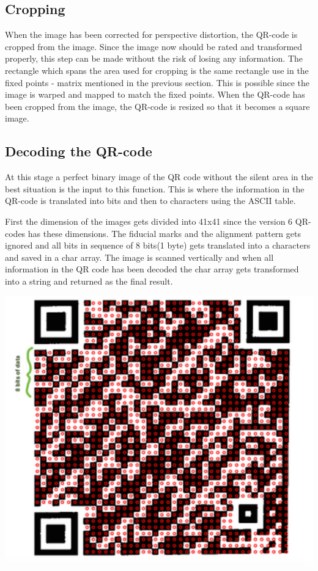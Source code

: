 \documentclass[12pt,a4paper]{article}
\newenvironment{Figure}
  {\par\medskip\noindent\minipage{\linewidth}}
  {\endminipage\par\medskip}
\begin{document}
\subsection{Cropping}
When the image has been corrected for perspective distortion, the QR-code is cropped from the image. Since the image now should be rated and transformed properly, this step can be made without the risk of losing any information. The rectangle which spans the area used for cropping is the same rectangle use in the fixed points - matrix mentioned in the previous section. This is possible since the image is warped and mapped to match the fixed points. When the QR-code has been cropped from the image, the QR-code is resized so that it becomes a square image. 

\subsection{Decoding the QR-code}
At this stage a perfect binary image of the QR code without the silent area in the best situation is the input to this function. This is where the information in the QR-code is translated into bits and then to characters using the ASCII table. 

First the dimension of the images gets divided into 41x41 since the version 6 QR-codes has these dimensions. The fiducial marks and the alignment pattern gets ignored and all bits in sequence of 8 bits(1 byte) gets translated into a characters and saved in a char array. The image is scanned vertically and when all information in the QR code has been decoded the char array gets transformed into a string and returned as the final result.
\begin{Figure}
  \centering
    \includegraphics[width=1\linewidth]{./img/decoding.png}
\end{Figure}
\end{document}
